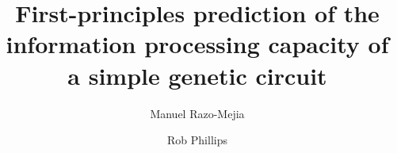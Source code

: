 

\newcommand{\mrm}[1]{\textcolor{ForestGreen}{(MR:~#1)}} %
\newcommand{\rp}[1]{\textcolor{red}{(RP:~#1)}} %

\usepackage{xparse}

\newcommand{\eref}[1]{Eq.~\ref{#1}}
\newcommand{\fref}[1]{Fig.~\ref{#1}}
\newcommand{\secref}[1]{Section~\ref{#1}}

\newcommand{\kpon}{k^{(p)}_{\text{on}}}
\newcommand{\kpoff}{k^{(p)}_{\text{off}}}
\newcommand{\kron}{k^{(r)}_{\text{on}}}
\newcommand{\kroff}{k^{(r)}_{\text{off}}}
\newcommand{\gm}{\gamma _m}
\newcommand{\gp}{\gamma _p}
\newcommand{\Km}{\bb{K}}
\newcommand{\Rm}{\bb{R}_m}
\newcommand{\Gm}{\bb{\Gamma}_m}
\newcommand{\Rp}{\bb{R}_p}
\newcommand{\Gp}{\bb{\Gamma}_p}
\newcommand{\PP}{\bb{P}}
\newcommand{\ee}[1]{\left\langle #1 \right\rangle}
\newcommand{\bb}[1]{\mathbf{#1}}
\newcommand{\dt}[1]{{d{#1} \over dt}}
\newcommand{\ddt}[1]{{\partial{#1} \over \partial t}}
\newcommand{\smp}{\sum_m \sum_p}
\newcommand{\foldchange}{\text{fold-change}}
\newcommand{\Nns}{N_\text{NS}}
\newcommand{\eR}{\Delta\varepsilon_r}
\newcommand{\eAI}{\Delta\varepsilon_{AI}}
\newcommand{\pbound}{p_{_\text{bound}}}
\let\oldth\th
\renewcommand\th{\text{th}}


\title{\textbf{First-principles prediction of the information processing
capacity of a simple genetic circuit}}
\author[1]{Manuel Razo-Mejia}
\author[1, 2, 3, *]{Rob Phillips}


